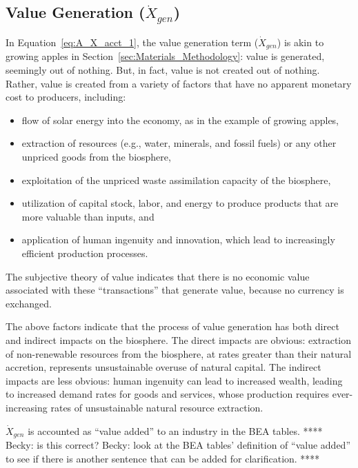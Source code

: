 \subsection{Value Generation ($\dot{X}_{gen}$)}

\noindent In Equation~\ref{eq:A_X_acct_1}, 
the value generation term ($\dot{X}_{gen}$) is akin to growing apples
in Section~\ref{sec:Materials_Methodology}: 
value is generated, seemingly out of nothing.
But, in fact, value is not created out of nothing. 
Rather, value is created from a variety of factors that have no apparent 
monetary cost to producers, including:

\begin{itemize}
	\item{flow of solar energy
	into the economy,
	as in the example of growing apples,}
	\item{extraction of resources (e.g., water, minerals, and
	fossil fuels) or any other unpriced goods from the biosphere,}
	\item{exploitation of the unpriced waste assimilation capacity of the biosphere,}
	\item{utilization of capital stock, labor, and energy to produce products
	that are more valuable than inputs, and}
	\item{application of human ingenuity 
	and innovation, 
	which lead to increasingly efficient production processes.}
\end{itemize}

\noindent{}The subjective theory of value indicates that 
there is no economic value associated with these ``transactions''
that generate value, because no currency is exchanged. 

The above factors indicate that the process of value generation
has both direct and indirect impacts on the biosphere.
The direct impacts are obvious: 
extraction of non-renewable resources from the biosphere, 
at rates greater than their natural accretion,
represents unsustainable overuse of natural capital.
The indirect impacts are less obvious: 
human ingenuity can lead to increased wealth,
leading to increased demand rates for goods and services, 
whose production requires ever-increasing rates 
of unsustainable natural resource extraction.

$\dot{X}_{gen}$ is accounted as ``value added'' to an industry in the BEA tables.
**** Becky: is this correct? 
Becky: look at the BEA tables' definition of ``value added'' to 
see if there is another sentence that can be added for clarification. ****



